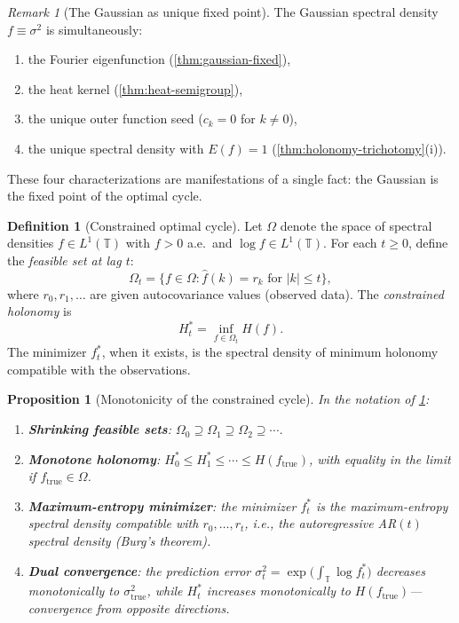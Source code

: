 \documentclass[12pt]{amsart}
\newtheorem{proposition}[theorem]{Proposition}
\theoremstyle{definition}
\newtheorem{definition}[theorem]{Definition}
\theoremstyle{remark}
\newtheorem*{remark}{Remark}
\newcommand{\bT}{\mathbb{T}}
\begin{document}
\begin{remark}[The Gaussian as unique fixed point]
The Gaussian spectral density $f \equiv \sigma^2$ is simultaneously:
\begin{enumerate}[label=(\alph*)]
\item the Fourier eigenfunction (\cref{thm:gaussian-fixed}),
\item the heat kernel (\cref{thm:heat-semigroup}),
\item the unique outer function seed ($c_k = 0$ for $k \neq 0$),
\item the unique spectral density with $E(f) = 1$ (\cref{thm:holonomy-trichotomy}(i)).
\end{enumerate}
These four characterizations are manifestations of a single fact: the Gaussian is the fixed point of the optimal cycle.
\end{remark}

\begin{definition}[Constrained optimal cycle]\label{def:optimal-cycle}
Let $\Omega$ denote the space of spectral densities $f \in L^1(\bT)$ with $f > 0$ a.e.\ and $\log f \in L^1(\bT)$. For each $t \geq 0$, define the \emph{feasible set at lag $t$}:
\[
\Omega_t = \bigl\{f \in \Omega : \widehat{f}(k) = r_k \text{ for } |k| \leq t\bigr\},
\]
where $r_0, r_1, \ldots$ are given autocovariance values (observed data). The \emph{constrained holonomy} is
\[
H_t^* = \inf_{f \in \Omega_t} H(f).
\]
The minimizer $f_t^*$, when it exists, is the spectral density of minimum holonomy compatible with the observations.
\end{definition}

\begin{proposition}[Monotonicity of the constrained cycle]\label{prop:holonomy-monotone}
In the notation of \cref{def:optimal-cycle}:
\begin{enumerate}[label=(\roman*)]
\item \textbf{Shrinking feasible sets}: $\Omega_0 \supseteq \Omega_1 \supseteq \Omega_2 \supseteq \cdots$.
\item \textbf{Monotone holonomy}: $H_0^* \leq H_1^* \leq \cdots \leq H(f_{\mathrm{true}})$, with equality in the limit if $f_{\mathrm{true}} \in \Omega$.
\item \textbf{Maximum-entropy minimizer}: the minimizer $f_t^*$ is the maximum-entropy spectral density compatible with $r_0, \ldots, r_t$, i.e., the autoregressive AR$(t)$ spectral density (Burg's theorem).
\item \textbf{Dual convergence}: the prediction error $\sigma_t^2 = \exp\bigl(\int_{\bT} \log f_t^*\bigr)$ decreases monotonically to $\sigma_{\mathrm{true}}^2$, while $H_t^*$ increases monotonically to $H(f_{\mathrm{true}})$---convergence from opposite directions.
\end{enumerate}
\end{proposition}
\end{document}
